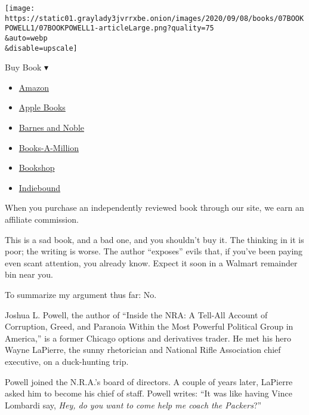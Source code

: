 \texttt{[image: https://static01.graylady3jvrrxbe.onion/images/2020/09/08/books/07BOOKPOWELL1/07BOOKPOWELL1-articleLarge.png?quality=75\\\&auto=webp\\\&disable=upscale]}

Buy Book ▾

\begin{itemize}
\tightlist
\item
  \href{https://www.amazon.com/gp/search?index=books\&tag=NYTBSREV-20\&field-keywords=Inside+the+NRA+Joshua+L.+Powell}{Amazon}
\item
  \href{https://du-gae-books-dot-nyt-du-prd.appspot.com/buy?title=Inside+the+NRA\&author=Joshua+L.+Powell}{Apple
  Books}
\item
  \href{https://www.anrdoezrs.net/click-7990613-11819508?url=https\%3A\%2F\%2Fwww.barnesandnoble.com\%2Fw\%2F\%3Fean\%3D9781538737255}{Barnes
  and Noble}
\item
  \href{https://www.anrdoezrs.net/click-7990613-35140?url=https\%3A\%2F\%2Fwww.booksamillion.com\%2Fp\%2FInside\%2Bthe\%2BNRA\%2FJoshua\%2BL.\%2BPowell\%2F9781538737255}{Books-A-Million}
\item
  \href{https://bookshop.org/a/3546/9781538737255}{Bookshop}
\item
  \href{https://www.indiebound.org/book/9781538737255?aff=NYT}{Indiebound}
\end{itemize}

When you purchase an independently reviewed book through our site, we
earn an affiliate commission.

This is a sad book, and a bad one, and you shouldn't buy it. The
thinking in it is poor; the writing is worse. The author ``exposes''
evils that, if you've been paying even scant attention, you already
know. Expect it soon in a Walmart remainder bin near you.

To summarize my argument thus far: No.

Joshua L. Powell, the author of ``Inside the NRA: A Tell-All Account of
Corruption, Greed, and Paranoia Within the Most Powerful Political Group
in America,'' is a former Chicago options and derivatives trader. He met
his hero Wayne LaPierre, the sunny rhetorician and National Rifle
Association chief executive, on a duck-hunting trip.

Powell joined the N.R.A.'s board of directors. A couple of years later,
LaPierre asked him to become his chief of staff. Powell writes: ``It was
like having Vince Lombardi say, \emph{Hey, do you want to come help me
coach the Packers}?''

